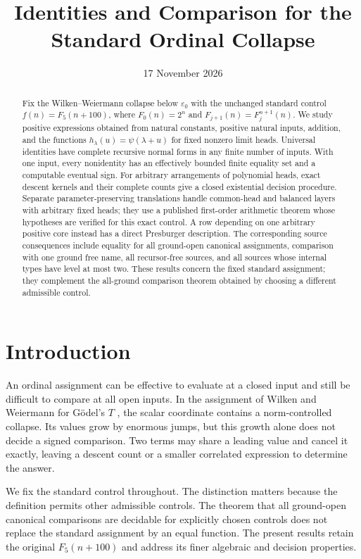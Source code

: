 \documentclass[11pt,a4paper]{article}
\title{Identities and Comparison for the Standard Ordinal Collapse}
\author{}
\date{17 November 2026}
\theoremstyle{definition}
\theoremstyle{remark}
\numberwithin{equation}{section}
\begin{document}
\maketitle

\begin{abstract}
Fix the Wilken--Weiermann collapse below $\varepsilon_0$ with the
unchanged standard control $f(n)=F_5(n+100)$, where $F_0(n)=2^n$ and
$F_{j+1}(n)=F_j^{n+1}(n)$.  We study positive expressions obtained from
natural constants, positive natural inputs, addition, and the functions
$h_\lambda(u)=\psi(\lambda+u)$ for fixed nonzero limit heads.
Universal identities have complete recursive normal forms in any finite
number of inputs.  With one input, every nonidentity has an effectively
bounded finite equality set and a computable eventual sign.  For arbitrary
arrangements of polynomial heads, exact descent kernels and their complete
counts give a closed existential decision procedure.  Separate
parameter-preserving translations handle common-head and balanced layers
with arbitrary fixed heads; they use a published first-order arithmetic
theorem whose hypotheses are verified for this exact control.  A row
depending on one arbitrary positive core instead has a direct Presburger
description.  The corresponding source consequences include equality for
all ground-open canonical assignments, comparison with one ground free
name, all recursor-free sources, and all sources whose internal types have
level at most two.  These results concern the fixed standard assignment;
they complement the all-ground comparison theorem obtained by choosing a
different admissible control.
\end{abstract}
\tableofcontents

\section{Introduction}

An ordinal assignment can be effective to evaluate at a closed input and
still be difficult to compare at all open inputs.  In the assignment of
Wilken and Weiermann for G\"odel's $T$ \cite{ww}, the scalar coordinate
contains a norm-controlled collapse.  Its values grow by enormous jumps,
but this growth alone does not decide a signed comparison.  Two terms may
share a leading value and cancel it exactly, leaving a descent count or a
smaller correlated expression to determine the answer.

We fix the standard control throughout.  The distinction matters because
the definition permits other admissible controls.  The theorem that all
ground-open canonical comparisons are decidable for explicitly chosen
controls \cite{wwcomparison} does not replace the standard assignment by
an equal function.  The present results retain the original
$F_5(n+100)$ and address its finer algebraic and decision properties.
\end{document}
